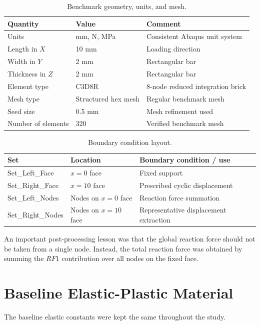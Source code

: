 \documentclass[11pt,a4paper]{article}
\begin{document}
\begin{table}[H]
\centering
\caption{Benchmark geometry, units, and mesh.}
\begin{tabular}{lll}
\toprule
Quantity & Value & Comment \\
\midrule
Units & mm, N, MPa & Consistent Abaqus unit system \\
Length in $X$ & 10 mm & Loading direction \\
Width in $Y$ & 2 mm & Rectangular bar \\
Thickness in $Z$ & 2 mm & Rectangular bar \\
Element type & C3D8R & 8-node reduced integration brick \\
Mesh type & Structured hex mesh & Regular benchmark mesh \\
Seed size & 0.5 mm & Mesh refinement used \\
Number of elements & 320 & Verified benchmark mesh \\
\bottomrule
\end{tabular}
\end{table}

\begin{table}[H]
\centering
\caption{Boundary condition layout.}
\begin{tabular}{lll}
\toprule
Set & Location & Boundary condition / use \\
\midrule
Set\_Left\_Face & $x=0$ face & Fixed support \\
Set\_Right\_Face & $x=10$ face & Prescribed cyclic displacement \\
Set\_Left\_Nodes & Nodes on $x=0$ face & Reaction force summation \\
Set\_Right\_Nodes & Nodes on $x=10$ face & Representative displacement extraction \\
\bottomrule
\end{tabular}
\end{table}

\noindent
An important post-processing lesson was that the global reaction force should not be taken from a single node. Instead, the total reaction force was obtained by summing the $RF1$ contribution over all nodes on the fixed face.

\section{Baseline Elastic-Plastic Material}

The baseline elastic constants were kept the same throughout the study.
\end{document}
